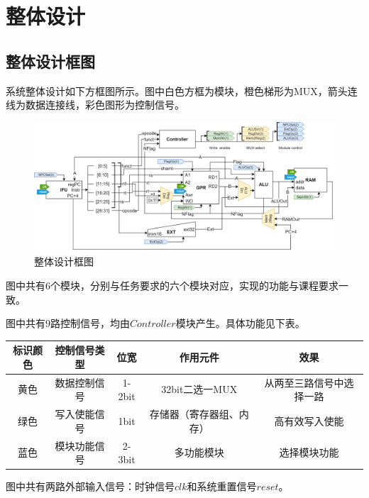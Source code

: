 \documentclass[main.tex]{subfiles}
\begin{document}
\section{整体设计}
\subsection{整体设计框图}
系统整体设计如下方框图所示。图中白色方框为模块，橙色梯形为MUX，箭头连线为数据连接线，彩色图形为控制信号。
\begin{figure}[h]
\centering
\includegraphics[width=\textwidth]{images/PCOCD-P1-overall-block.png}
\caption{整体设计框图}
\end{figure}

图中共有$6$个模块，分别与任务要求的六个模块对应，实现的功能与课程要求一致。

图中共有$9$路控制信号，均由$Controller$模块产生。具体功能见下表。

\begin{center}
    \begin{tabular}{c c c c c}
        \toprule
        标识颜色 & 控制信号类型 & 位宽 & 作用元件 & 效果\\
        \midrule
         黄色 & 数据控制信号 & 1-2bit & 32bit二选一MUX & 从两至三路信号中选择一路 \\
         绿色 & 写入使能信号 & 1bit & 存储器（寄存器组、内存） & 高有效写入使能 \\
         蓝色 & 模块功能信号 & 2-3bit & 多功能模块 & 选择模块功能 \\
        \bottomrule
    \end{tabular}
\end{center}

图中共有两路外部输入信号：时钟信号$clk$和系统重置信号$reset$。

\clearpage

\begin{figure}[h]
\end{figure}
\clearpage
\end{document}
